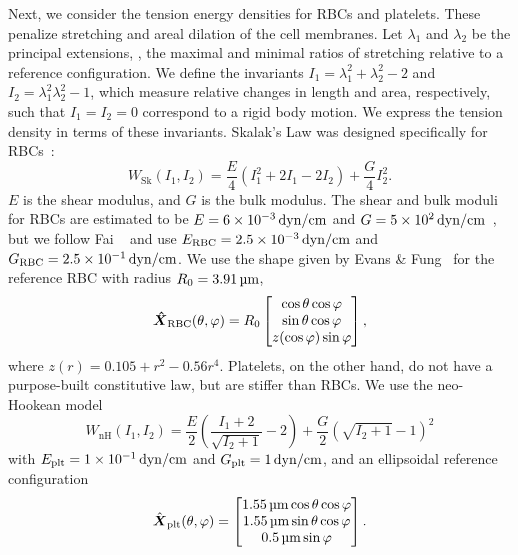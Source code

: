 Next, we consider the tension energy densities for RBCs and platelets. These penalize stretching and areal
dilation of the cell membranes. Let $\lambda_1$ and $\lambda_2$ be the principal extensions, , the
maximal and minimal ratios of stretching relative to a reference configuration. We define the invariants
$I_1=\lambda_1^2+\lambda_2^2-2$ and $I_2 = \lambda_1^2\lambda_2^2-1$, which measure relative changes in length and
area, respectively, such that $I_1 = I_2 = 0$ correspond to a rigid body motion. We express the tension density in
terms of these invariants. Skalak's Law was designed specifically for RBCs~\cite{Skalak:1973tp}:
\begin{equation}\label{eq:skalak-law}
    W_\text{Sk}(I_1, I_2) = \frac{E}4\left(I_1^2 + 2I_1 - 2I_2\right) + \frac{G}4 I_2^2.
\end{equation}
$E$ is the shear modulus, and $G$ is the bulk modulus. The shear and bulk moduli for RBCs are estimated to be
$E = 6\sci{-3}\dynpercm$ and $G = 5\sci2\dynpercm$~\cite{Mohandas:1994tg}, but we follow Fai ~%
\cite{Fai:2013do} and use $\rbc{E} = 2.5\sci{-3}\dynpercm$ and $\rbc{G} = 2.5\sci{-1}\dynpercm$. We use
the shape given by Evans \& Fung~\cite{Evans:1972uf} for the reference RBC with radius $R_0 = 3.91\um$,
\begin{equation*}
    {\boldsymbol{\hat{X}}}_\text{RBC}(\theta, \varphi) = R_0\begin{bmatrix}
            \cos\theta\cos\varphi \\
            \sin\theta\cos\varphi \\
            z(\cos\varphi)\sin\varphi
    \end{bmatrix},
\end{equation*}
where $z(r) = 0.105 + r^2 - 0.56r^4$. Platelets, on the other hand, do not have a purpose-built constitutive law,
but are stiffer than RBCs. We use the neo-Hookean model
\begin{equation}\label{eq:neohookean}
    W_\text{nH}(I_1, I_2) = \frac{E}2\left(\frac{I_1+2}{\sqrt{I_2+1}}-2\right) + \frac{G}2 {\left(\sqrt{I_2+1}-1\right)}^2
\end{equation}
with $\plt{E} = 1\sci{-1}\dynpercm$ and $\plt{G} = 1\dynpercm$, and an ellipsoidal reference configuration~%
\cite{Frojmovic:1982wk}
\begin{equation*}
    \plt{\hat{\vec{X}}}(\theta, \varphi) = \begin{bmatrix}
            1.55\um\cos\theta\cos\varphi \\
            1.55\um\sin\theta\cos\varphi \\
            0.5\um\sin\varphi
    \end{bmatrix}.
\end{equation*}

